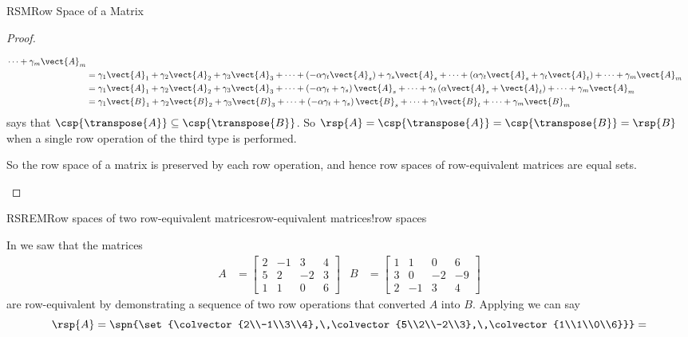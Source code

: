 \begin{subsect}{RSM}{Row Space of a Matrix}
\begin{proof}
\begin{para}
\begin{align*}
\cdots+
\gamma_m\vect{A}_m\\
%
&=
\gamma_1\vect{A}_1+
\gamma_2\vect{A}_2+
\gamma_3\vect{A}_3+
\cdots+
\left(-\alpha\gamma_t\vect{A}_s\right)+\gamma_s\vect{A}_s+
\cdots+
\left(\alpha\gamma_t\vect{A}_s+\gamma_t\vect{A}_t\right)+
\cdots+
\gamma_m\vect{A}_m\\
%
&=
\gamma_1\vect{A}_1+
\gamma_2\vect{A}_2+
\gamma_3\vect{A}_3+
\cdots+
\left(-\alpha\gamma_t+\gamma_s\right)\vect{A}_s+
\cdots+
\gamma_t\left(\alpha\vect{A}_s+\vect{A}_t\right)+
\cdots+
\gamma_m\vect{A}_m\\
%
&=
\gamma_1\vect{B}_1+
\gamma_2\vect{B}_2+
\gamma_3\vect{B}_3+
\cdots+
\left(-\alpha\gamma_t+\gamma_s\right)\vect{B}_s+
\cdots+
\gamma_t\vect{B}_t+
\cdots+
\gamma_m\vect{B}_m
\end{align*}
%
says that $\csp{\transpose{A}}\subseteq\csp{\transpose{B}}$.  So $\rsp{A}=\csp{\transpose{A}}=\csp{\transpose{B}}=\rsp{B}$ when a single row operation of the third type is performed.\end{para}
%
\begin{para}So the row space of a matrix is preserved by each row operation, and hence row spaces of row-equivalent matrices are equal sets.\end{para}
%
\end{proof}
%
\begin{example}{RSREM}{Row spaces of two row-equivalent matrices}{row-equivalent matrices!row spaces}
\begin{para}In  we saw that the matrices
\begin{align*}
A&=\begin{bmatrix}
2&-1&3&4\\
5&2&-2&3\\
1&1&0&6
\end{bmatrix}
&
B&=\begin{bmatrix}
1&1&0&6\\
3&0&-2&-9\\
2&-1&3&4
\end{bmatrix}
\end{align*}
%
are row-equivalent by demonstrating a sequence of two row operations that converted $A$ into $B$.  Applying  we can say
%
\begin{equation*}
\rsp{A}=
\spn{\set{\colvector{2\\-1\\3\\4},\,\colvector{5\\2\\-2\\3},\,\colvector{1\\1\\0\\6}}}=

\end{equation*}
\end{para}
\end{example}
\end{subsect}
